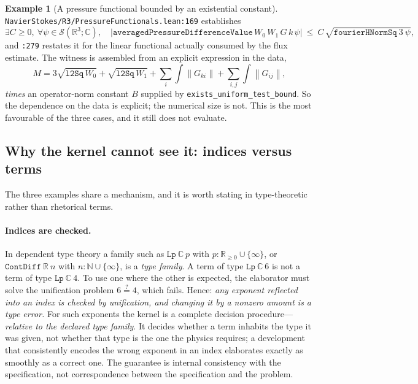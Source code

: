 \documentclass[11pt]{article}
\newcommand{\R}{\mathbb{R}}
\newcommand{\norm}[1]{\left\lVert #1\right\rVert}
\newcommand{\ct}[1]{\texttt{#1}}
\newcommand{\file}[1]{\texttt{\small #1}}
\theoremstyle{plain}
\theoremstyle{definition}
\newtheorem{example}[theorem]{Example}
\theoremstyle{remark}
\begin{document}
\begin{example}[A pressure functional bounded by an existential constant]
\label{ex:pressure}
\file{NavierStokes/R3/PressureFunctionals.lean:169} establishes
\[
  \exists C\ge0,\ \forall \psi\in\mathcal{S}(\R^3;\mathbb{C}),\quad
  \bigl\lvert \ct{averagedPressureDifferenceValue}\,W_0\,W_1\,G\,k\,\psi
  \bigr\rvert
  \ \le\ C\,\sqrt{\ct{fourierHNormSq}\ 3\ \psi},
\]
and \file{:279} restates it for the linear functional actually consumed by the
flux estimate. The witness is assembled from an explicit expression in the data,
\[
  M=3\sqrt{\ct{l2Sq}\,W_0}+\sqrt{\ct{l2Sq}\,W_1}
   +\sum_i\int\norm{G_{ki}}
   +\sum_{i,j}\int\norm{G_{ij}},
\]
\emph{times} an operator-norm constant $B$ supplied by
\ct{exists\_uniform\_test\_bound}. So the dependence on the data is explicit;
the numerical size is not. This is the most favourable of the three cases, and
it still does not evaluate.
\end{example}

\subsection{Why the kernel cannot see it: indices versus terms}
\label{sec:index-vs-term}

The three examples share a mechanism, and it is worth stating in
type-theoretic rather than rhetorical terms.

\paragraph{Indices are checked.} In dependent type theory a family such as
$\ct{Lp}\ \mathbb{C}\ p$ with $p:\mathbb{R}_{\ge0}\cup\{\infty\}$, or
$\ct{ContDiff}\ \R\ n$ with $n:\mathbb{N}\cup\{\infty\}$, is a \emph{type
family}. A term of type $\ct{Lp}\ \mathbb{C}\ 6$ is not a term of type
$\ct{Lp}\ \mathbb{C}\ 4$. To use one where the other is expected, the
elaborator must solve the unification problem $6\stackrel{?}{=}4$, which fails.
Hence: \emph{any exponent reflected into an index is checked by unification, and
changing it by a nonzero amount is a type error.} For such exponents the kernel
is a complete decision procedure---\emph{relative to the declared type family}.
It decides whether a term inhabits the type it was given, not whether that type
is the one the physics requires; a development that consistently encodes the
wrong exponent in an index elaborates exactly as smoothly as a correct one. The
guarantee is internal consistency with the specification, not correspondence
between the specification and the problem.
\end{document}

